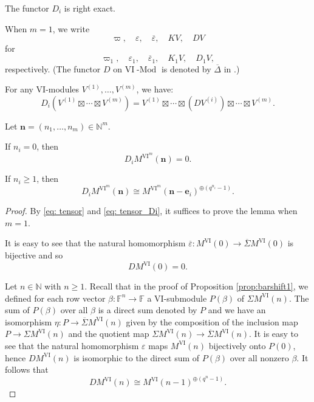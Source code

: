 \documentclass{amsart}
\numberwithin{equation}{section}
\DeclareMathOperator{\Mod}{-Mod}
\newcommand{\N}{{\mathbb{N}}}
\newcommand{\F}{{\mathbb{F}}}
\newcommand{\VI}{{\mathrm{VI}}}
\newcommand{\SSigma}{{\overline{\Sigma}}}
\begin{document}
\begin{remark} \label{rem: exactness D}
   The functor $D_i$ is right exact.
\end{remark}

\begin{notation}
When $m=1$, we write 
\[ \varpi,\quad \varepsilon,\quad \overline{\varepsilon},\quad KV,\quad DV \] for 
\[ \varpi_1,\quad \varepsilon_1,\quad \overline{\varepsilon}_1,\quad K_1V,\quad D_1V, \]  
respectively. (The functor $D$ on $\VI\Mod$ is denoted by $\overline{\Delta}$ in \cite{na}.)  
\end{notation}

For any $\VI$-modules $V^{(1)}, \ldots, V^{(m)}$, we have:
\begin{equation}\label{eq: tensor_Di}
D_i\left( V^{(1)}\boxtimes \cdots\boxtimes V^{(m)} \right) 
= V^{(1)}\boxtimes \cdots \boxtimes \left( D V^{(i)} \right) \boxtimes \cdots\boxtimes V^{(m)}. 
\end{equation}


\begin{lemma} \label{lem: Di of free}
   Let $\mathbf{n}=(n_1, \ldots, n_m)\in \N^m$. 
   
   If $n_i=0$, then  
   \[ D_i M^{\VI^m}(\mathbf{n}) = 0. \]
   
   If $n_i\geqslant 1$, then 
   \[ D_i M^{\VI^m}(\mathbf{n}) \cong M^{\VI^m}(\mathbf{n}-\mathbf{e}_i)^{\oplus (q^{n_i}-1)}. \]
\end{lemma}

\begin{proof}
   By \eqref{eq: tensor} and \eqref{eq: tensor_Di}, it suffices to prove the lemma when $m=1$. 

   It is easy to see that the natural homomorphism $\overline{\varepsilon}: M^{\VI}(0)\to \SSigma M^{\VI}(0)$ is bijective and so 
   \[ DM^{\VI}(0) = 0. \]
   
   Let $n\in \N$ with $n\geqslant 1$. Recall that in the proof of Proposition \ref{prop:barshift1}, we defined for each row vector $\beta: \F^n \to \F$ a $\VI$-submodule $P(\beta)$ of $\Sigma M^{\VI}(n)$. The sum of $P(\beta)$ over all $\beta$ is a direct sum denoted by $P$ and we have an isomorphism $\eta: P \to \SSigma M^{\VI}(n)$ given by the composition of the inclusion map $P\to \Sigma M^{\VI}(n)$ and the quotient map $\Sigma M^{\VI}(n) \to \SSigma M^{\VI}(n)$. It is easy to see that the natural homomorphism $\varepsilon$ maps $M^{\VI}(n)$ bijectively onto $P(0)$, hence $D M^{\VI}(n)$ is isomorphic to the direct sum of $P(\beta)$ over all nonzero $\beta$. It follows  that 
   \[ DM^{\VI}(n) \cong M^{\VI}(n-1)^{\oplus (q^{n}-1)}.  \]   
\end{proof}
\end{document}

